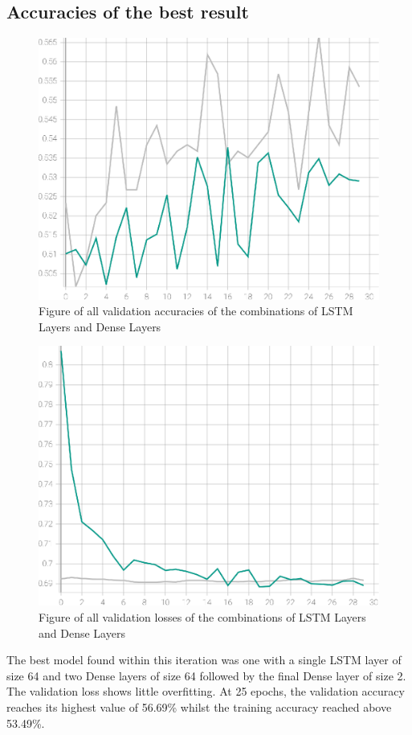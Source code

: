 \subsection{Accuracies of the best result}
\begin{figure}[ht]
    \centering
    \includegraphics[width=0.95\columnwidth]{figures/results/lstm_iteration1_1l64_3d64_accuracy.eps}
    \caption[Figure of accuracies and losses for Iteration 1]{Figure of all validation accuracies of the combinations of LSTM Layers and Dense Layers}
    \label{fig:iteration1_best_accuracy}
\end{figure}
\FloatBarrier
\begin{figure}[ht]
    \centering
    \includegraphics[width=0.95\columnwidth]{figures/results/lstm_iteration1_1l64_3d64_loss.eps}
    \caption[Figure of accuracies and losses for Iteration 1]{Figure of all validation losses of the combinations of LSTM Layers and Dense Layers}
    \label{fig:iteration1_best_loss}
\end{figure}
\FloatBarrier
The best model found within this iteration was one with a single LSTM layer of size 64 and two Dense layers of size 64 followed
by the final Dense layer of size 2. The validation loss shows little overfitting. At 25 epochs, the validation accuracy
reaches its highest value of 56.69\% whilst the training accuracy reached above 53.49\%.
